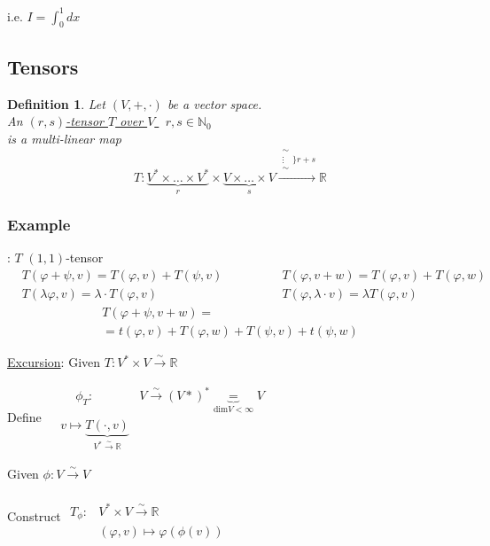 \documentclass[10pt]{amsart}
\newtheorem{definition}{Definition}
\begin{document}
\begin{multicols*}{2}
i.e. $I = \int_0^1 dx$

\subsection{Tensors}

\begin{definition}
	Let $(V,+,\cdot)$ be a vector space. \\
	An \underline{ $(r,s)$-tensor $T$ over $V$ } \qquad \, $r,s \in \mathbb{N}_0 $\\
	is a multi-linear map
	\[
	T: \underbrace{ V^* \times \dots \times V^* }_r \times \underbrace{ V \times \dots \times V}_s \xrightarrow{ \substack{ \sim \\ \vdots \\ \sim } \rbrace r + s } \mathbb{R}
	\]
\end{definition}

\subsubsection{Example}: $T$ $(1,1)$-tensor
\[
\begin{aligned}
& T(\varphi + \psi, v) = T(\varphi,v) + T(\psi,v) \\ 
& T(\lambda \varphi , v) = \lambda \cdot T(\varphi,v)
\end{aligned} \qquad \qquad \begin{gathered}
T(\varphi,v+w) = T(\varphi,v) + T(\varphi,w) \\ 
T(\varphi, \lambda \cdot v) = \lambda T(\varphi, v) 
\end{gathered}
\]
\[
\begin{gathered}
T(\varphi + \psi , v+ w)  = \\
= t(\varphi,v) + T(\varphi,w) + T(\psi,v) + t(\psi,w)
\end{gathered}
\]

\underline{Excursion}:
Given $T:V^* \times V \xrightarrow{ \sim } \mathbb{R}$

Define $\begin{aligned} & \quad \ 
\phi_T: & V\xrightarrow{ \sim } (V*)^* \underbrace{=}_{\text{dim}V < \infty} V \\
& v\mapsto \underbrace{ T(\cdot , v)  }_{V^* \xrightarrow{ \sim } \mathbb{R}} \end{aligned}$

Given $\phi : V \xrightarrow{ \sim } V$

Construct $\begin{aligned} & \quad \\ 
T_{\phi} : & V^* \times V \xrightarrow{ \sim } \mathbb{R} \\
& (\varphi,v) \mapsto \varphi(\phi(v)) \end{aligned}$


\end{multicols*}
\end{document}
